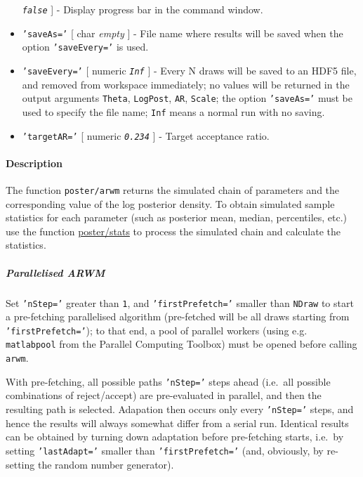 \begin{itemize}
   \emph{\texttt{false}} {]} - Display progress bar in the command
   window.
 \item
   \texttt{'saveAs='} {[} char \textbar{} \emph{empty} {]} - File name
   where results will be saved when the option \texttt{'saveEvery='} is
   used.
 \item
   \texttt{'saveEvery='} {[} numeric \textbar{} \emph{\texttt{Inf}} {]} -
   Every N draws will be saved to an HDF5 file, and removed from
   workspace immediately; no values will be returned in the output
   arguments \texttt{Theta}, \texttt{LogPost}, \texttt{AR},
   \texttt{Scale}; the option \texttt{'saveAs='} must be used to specify
   the file name; \texttt{Inf} means a normal run with no saving.
 \item
   \texttt{'targetAR='} {[} numeric \textbar{} \emph{\texttt{0.234}} {]}
   - Target acceptance ratio.
 \end{itemize}
 
 \paragraph{Description}
 
 The function \texttt{poster/arwm} returns the simulated chain of
 parameters and the corresponding value of the log posterior density. To
 obtain simulated sample statistics for each parameter (such as posterior
 mean, median, percentiles, etc.) use the function \url{poster/stats} to
 process the simulated chain and calculate the statistics.
 
 \subparagraph{Parallelised ARWM}
 
 Set \texttt{'nStep='} greater than \texttt{1}, and
 \texttt{'firstPrefetch='} smaller than \texttt{NDraw} to start a
 pre-fetching parallelised algorithm (pre-fetched will be all draws
 starting from \texttt{'firstPrefetch='}); to that end, a pool of
 parallel workers (using e.g. \texttt{matlabpool} from the Parallel
 Computing Toolbox) must be opened before calling \texttt{arwm}.
 
 With pre-fetching, all possible paths \texttt{'nStep='} steps ahead
 (i.e.~all possible combinations of reject/accept) are pre-evaluated in
 parallel, and then the resulting path is selected. Adapation then occurs
 only every \texttt{'nStep='} steps, and hence the results will always
 somewhat differ from a serial run. Identical results can be obtained by
 turning down adaptation before pre-fetching starts, i.e.~by setting
 \texttt{'lastAdapt='} smaller than \texttt{'firstPrefetch='} (and,
 obviously, by re-setting the random number generator).
 
